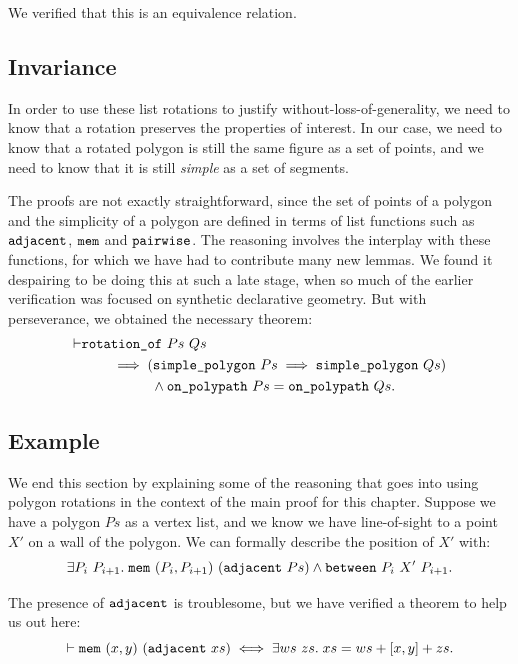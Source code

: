 We verified that this is an equivalence relation.

\subsection{Invariance}
In order to use these list rotations to justify without-loss-of-generality, we need to know that a rotation preserves the properties of interest. In our case, we need to know that a rotated polygon is still the same figure as a set of points, and we need to know that it is still \emph{simple} as a set of segments. 

The proofs are not exactly straightforward, since the set of points of a polygon and the simplicity of a polygon are defined in terms of list functions such as $\texttt{adjacent}$, $\texttt{mem}$ and $\texttt{pairwise}$. The reasoning involves the interplay with these functions, for which we have had to contribute many new lemmas. We found it despairing to be doing this at such a late stage, when so much of the earlier verification was focused on synthetic declarative geometry. But with perseverance, we obtained the necessary theorem:
\begin{equation}\label{eq:PolygonRotateInvariant}
\begin{aligned}
\vdash      &\texttt{rotation\_of}\ Ps\ Qs\\
    &\qquad\implies (\texttt{simple\_polygon}\ Ps \implies \texttt{simple\_polygon}\ Qs)\\
    &\qquad\qquad\quad\wedge \texttt{on\_polypath}\ Ps = \texttt{on\_polypath}\ Qs.
  \end{aligned}
\end{equation}

\subsection{Example}
We end this section by explaining some of the reasoning that goes into using polygon rotations in the context of the main proof for this chapter. Suppose we have a polygon $Ps$ as a vertex list, and we know we have line-of-sight to a point $X'$ on a wall of the polygon. We can formally describe the position of $X'$ with:
\begin{displaymath}
  \exists P_i\ P_{i+1}.\; \texttt{mem}\ (P_i,P_{i+1})\ (\texttt{adjacent}\ Ps) \wedge \texttt{between}\ P_i\ X'\ P_{i+1}.
\end{displaymath}

The presence of $\texttt{adjacent}$ is troublesome, but we have verified a theorem to help us out here:
\begin{equation*}
\vdash  \texttt{mem}\ (x,y)\ (\texttt{adjacent}\ xs) \iff 
\exists ws\ zs.\; xs = ws + [x,y] + zs.
\end{equation*}

